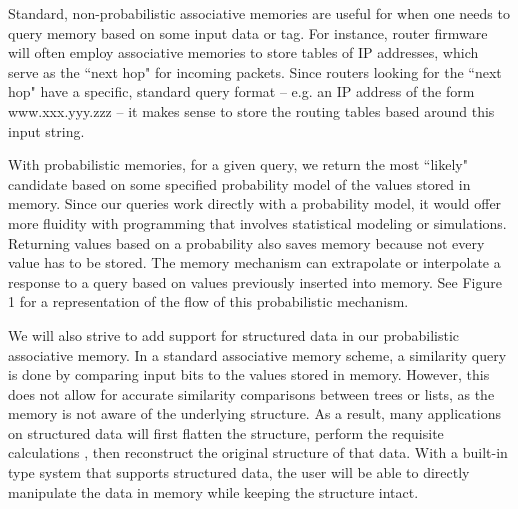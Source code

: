 \documentclass{sig-alternate}
\begin{document}
Standard, non-probabilistic associative memories are useful for when one needs to query memory based 
on some input data or tag. For instance, router firmware will often employ associative 
memories to store tables of IP addresses, which serve as the ``next hop" for incoming 
packets. Since routers looking for the ``next hop" have a specific, standard query 
format -- e.g. an IP address of the form www.xxx.yyy.zzz -- it makes sense to store the 
routing tables based around this input string.

With probabilistic memories, for a given query, we return the most ``likely" candidate 
based on some specified probability model of the values stored in memory. 
Since our queries work directly with a probability model, it would offer more fluidity
with programming that involves statistical modeling or simulations. Returning values
based on a probability also saves memory because not every value has to be stored. The 
memory mechanism can extrapolate or interpolate a response to a query based on values 
previously inserted into memory. See Figure 1 for a representation of the flow of 
this probabilistic mechanism.

We will also strive to add support for structured data in our probabilistic associative memory.
In a standard associative memory scheme, a similarity query is done by comparing input bits
to the values stored in memory. However, this does not allow for accurate similarity comparisons
between trees or lists, as the memory is not aware of the underlying structure. As a result,
many applications on structured data will first flatten the structure, perform the requisite calculations
, then reconstruct the original structure of that data. With a built-in type system
that supports structured data, the user will be able to directly manipulate the data in memory 
while keeping the structure intact.
\end{document}
